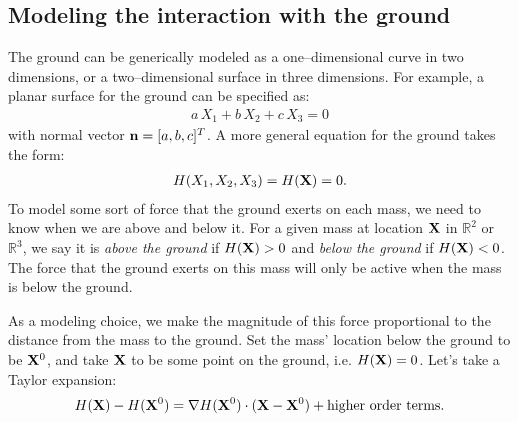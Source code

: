 \documentclass[10pt]{article}
\begin{document}
\subsection{Modeling the interaction with the ground}

The ground can be generically modeled as a one--dimensional curve in two dimensions, or a two--dimensional surface in three dimensions.  For example, a planar surface for the ground can be specified as:
\begin{align*}
a \, X_1 + b\, X_2 + c \,X_3 = 0
\end{align*}
with normal vector ${\bf n} = [a,b,c]^T$.  A more general equation for the ground takes the form:
\begin{align*}
H(X_1,X_2,X_3) = H({\bf X}) = 0.
\end{align*}
To model some sort of force that the ground exerts on each mass, we need to know when we are above and below it.  For a given mass at location ${\bf X}$ in $\mathbb{R}^2$ or $\mathbb{R}^3$, we say it is {\em above the ground} if $H({\bf X}) > 0$ and {\em below the ground} if $H({\bf X}) < 0$.  The force that the ground exerts on this mass will only be active when the mass is below the ground.

As a modeling choice, we make the magnitude of this force proportional to the distance from the mass to the ground.  Set the mass' location below the ground to be ${\bf X}^0$, and take ${\bf X}$ to be some point on the ground, i.e. $H({\bf X}) = 0$.  Let's take a Taylor expansion:
\begin{align*}
H({\bf X}) - H({\bf X}^0) = \nabla H({\bf X}^0) \cdot ({\bf X} - {\bf X}^0) + \text{higher order terms}. 
\end{align*}  
\end{document}
